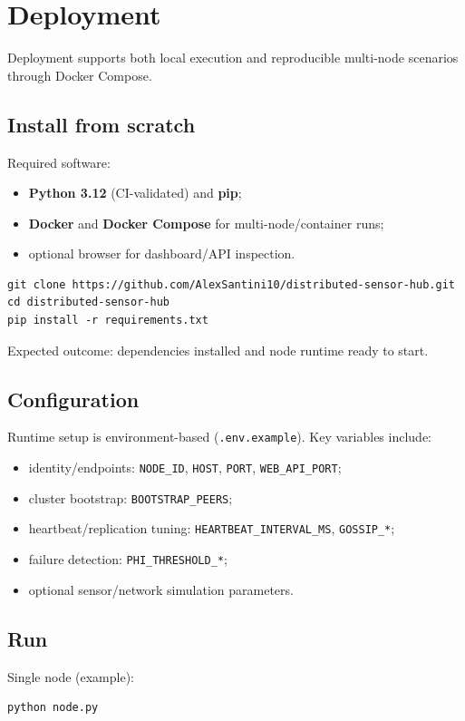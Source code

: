\section{Deployment}\label{deployment}

Deployment supports both local execution and reproducible multi-node scenarios through Docker Compose.

\subsection{Install from scratch}
Required software:
\begin{itemize}
  \item \textbf{Python 3.12} (CI-validated) and \textbf{pip};
  \item \textbf{Docker} and \textbf{Docker Compose} for multi-node/container runs;
  \item optional browser for dashboard/API inspection.
\end{itemize}

\begin{verbatim}
git clone https://github.com/AlexSantini10/distributed-sensor-hub.git
cd distributed-sensor-hub
pip install -r requirements.txt
\end{verbatim}

Expected outcome: dependencies installed and node runtime ready to start.

\subsection{Configuration}
Runtime setup is environment-based (\texttt{.env.example}). Key variables include:
\begin{itemize}
  \item identity/endpoints: \texttt{NODE\_ID}, \texttt{HOST}, \texttt{PORT}, \texttt{WEB\_API\_PORT};
  \item cluster bootstrap: \texttt{BOOTSTRAP\_PEERS};
  \item heartbeat/replication tuning: \texttt{HEARTBEAT\_INTERVAL\_MS}, \texttt{GOSSIP\_*};
  \item failure detection: \texttt{PHI\_THRESHOLD\_*};
  \item optional sensor/network simulation parameters.
\end{itemize}

\subsection{Run}
Single node (example):
\begin{verbatim}
python node.py
\end{verbatim}

